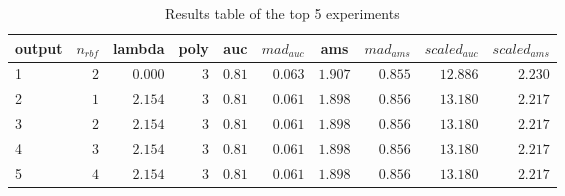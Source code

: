 \begin{table}[!tbp]
\caption{Results table of the top 5 experiments\label{table:results}} 
\begin{center}
\begin{tabular}{lrrrrrrrrr}
\hline\hline
\multicolumn{1}{l}{output}&\multicolumn{1}{c}{$n_{rbf}$}&\multicolumn{1}{c}{lambda}&\multicolumn{1}{c}{poly}&\multicolumn{1}{c}{auc}&\multicolumn{1}{c}{$mad_{auc}$}&\multicolumn{1}{c}{ams}&\multicolumn{1}{c}{$mad_{ams}$}&\multicolumn{1}{c}{$scaled_{auc}$}&\multicolumn{1}{c}{$scaled_{ams}$}\tabularnewline
\hline
1&$2$&$0.000$&$3$&$0.81$&$0.063$&$1.907$&$0.855$&$12.886$&$2.230$\tabularnewline
2&$1$&$2.154$&$3$&$0.81$&$0.061$&$1.898$&$0.856$&$13.180$&$2.217$\tabularnewline
3&$2$&$2.154$&$3$&$0.81$&$0.061$&$1.898$&$0.856$&$13.180$&$2.217$\tabularnewline
4&$3$&$2.154$&$3$&$0.81$&$0.061$&$1.898$&$0.856$&$13.180$&$2.217$\tabularnewline
5&$4$&$2.154$&$3$&$0.81$&$0.061$&$1.898$&$0.856$&$13.180$&$2.217$\tabularnewline
\hline
\end{tabular}\end{center}
\end{table}
